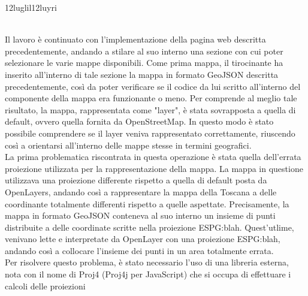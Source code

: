 12luglil12luyri



\\Il lavoro è continuato con l'implementazione della pagina web descritta precedentemente, andando a stilare al suo interno una sezione con cui poter selezionare le varie mappe disponibili. Come prima mappa, il tirocinante ha inserito all'interno di tale sezione la mappa in formato GeoJSON descritta precedentemente, così da poter verificare se il codice da lui scritto all'interno del componente della mappa era funzionante o meno. Per comprende al meglio tale risultato, la mappa, rappresentata come "layer", è stata sovrapposta a quella di default, ovvero quella fornita da OpenStreetMap. In questo modo è stato possibile comprendere se il layer veniva rappresentato correttamente, riuscendo così a orientarsi all'interno delle mappe stesse in termini geografici.
\\La prima problematica riscontrata in questa operazione è stata quella dell'errata proiezione utilizzata per la rappresentazione della mappa. La mappa in questione utilizzava una proiezione differente rispetto a quella di default posta da OpenLayers, andando così a rappresentare la mappa della Toscana a delle coordinante totalmente differenti rispetto a quelle aspettate. Precisamente, la mappa in formato GeoJSON conteneva al suo interno un insieme di punti distribuite a delle coordinate scritte nella proiezione ESPG:blah. Quest'utlime, venivano lette e interpretate da OpenLayer con una proiezione ESPG:blah, andando così a collocare l'insieme dei punti in un area totalmente errata.
\\Per risolvere questo problema, è stato necessario l'uso di una libreria esterna, nota con il nome di Proj4 (Proj4j per JavaScript) che si occupa di effettuare i calcoli delle proiezioni
















